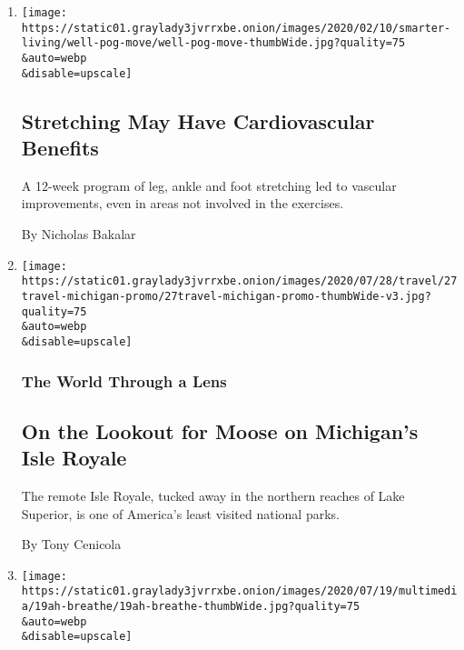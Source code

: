 \begin{enumerate}
\def\labelenumi{\arabic{enumi}.}
\item
  \href{/2020/07/27/well/move/stretching-heart-cardiovascular-health.html}{}

  \texttt{[image: https://static01.graylady3jvrrxbe.onion/images/2020/02/10/smarter-living/well-pog-move/well-pog-move-thumbWide.jpg?quality=75\\\&auto=webp\\\&disable=upscale]}

  \hypertarget{stretching-may-have-cardiovascular-benefits}{%
  \subsection{Stretching May Have Cardiovascular
  Benefits}\label{stretching-may-have-cardiovascular-benefits}}

  A 12-week program of leg, ankle and foot stretching led to vascular
  improvements, even in areas not involved in the exercises.

  By Nicholas Bakalar
\item
  \href{/2020/07/27/travel/moose-michigan-isle-royale.html}{}

  \texttt{[image: https://static01.graylady3jvrrxbe.onion/images/2020/07/28/travel/27travel-michigan-promo/27travel-michigan-promo-thumbWide-v3.jpg?quality=75\\\&auto=webp\\\&disable=upscale]}

  \hypertarget{the-world-through-a-lens}{%
  \subsubsection{The World Through a
  Lens}\label{the-world-through-a-lens}}

  \hypertarget{on-the-lookout-for-moose-on-michigans-isle-royale}{%
  \subsection{On the Lookout for Moose on Michigan's Isle
  Royale}\label{on-the-lookout-for-moose-on-michigans-isle-royale}}

  The remote Isle Royale, tucked away in the northern reaches of Lake
  Superior, is one of America's least visited national parks.

  By Tony Cenicola
\item
  \href{/2020/07/18/at-home/coronavirus-breathing-exercises.html}{}

  \texttt{[image: https://static01.graylady3jvrrxbe.onion/images/2020/07/19/multimedia/19ah-breathe/19ah-breathe-thumbWide.jpg?quality=75\\\&auto=webp\\\&disable=upscale]}


\end{enumerate}
